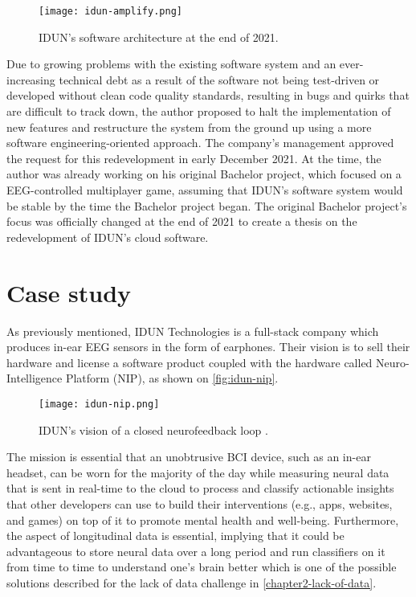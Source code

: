 \begin{figure}[!ht]
  \centering
  \texttt{[image: idun-amplify.png]}
  \caption{IDUN's software architecture at the end of 2021.}
  \label{fig:idun-amplify}
\end{figure}

Due to growing problems with the existing software system and an ever-increasing technical debt as a result of the software not being test-driven or developed without clean code quality standards, resulting in bugs and quirks that are difficult to track down, the author proposed to halt the implementation of new features and restructure the system from the ground up using a more software engineering-oriented approach. The company's management approved the request for this redevelopment in early December 2021. At the time, the author was already working on his original Bachelor project, which focused on a EEG-controlled multiplayer game, assuming that IDUN's software system would be stable by the time the Bachelor project began. The original Bachelor project's focus was officially changed at the end of 2021 to create a thesis on the redevelopment of IDUN's cloud software.

\section{Case study}
\label{chapter3-case-study}

As previously mentioned, IDUN Technologies is a full-stack company which produces in-ear EEG sensors in the form of earphones. Their vision is to sell their hardware and license a software product coupled with the hardware called Neuro-Intelligence Platform (NIP), as shown on \autoref{fig:idun-nip}.

\begin{figure}[!ht]
  \centering
  \texttt{[image: idun-nip.png]}
  \caption[IDUN's vision of a closed neurofeedback loop ]{IDUN's vision of a closed neurofeedback loop \citep{idun_guardian_nodate}.}
  \label{fig:idun-nip}
\end{figure}

The mission is essential that an unobtrusive BCI device, such as an in-ear headset, can be worn for the majority of the day while measuring neural data that is sent in real-time to the cloud to process and classify actionable insights that other developers can use to build their interventions (e.g., apps, websites, and games) on top of it to promote mental health and well-being. Furthermore, the aspect of longitudinal data is essential, implying that it could be advantageous to store neural data over a long period and run classifiers on it from time to time to understand one's brain better which is one of the possible solutions described for the lack of data challenge in \autoref{chapter2-lack-of-data}.

